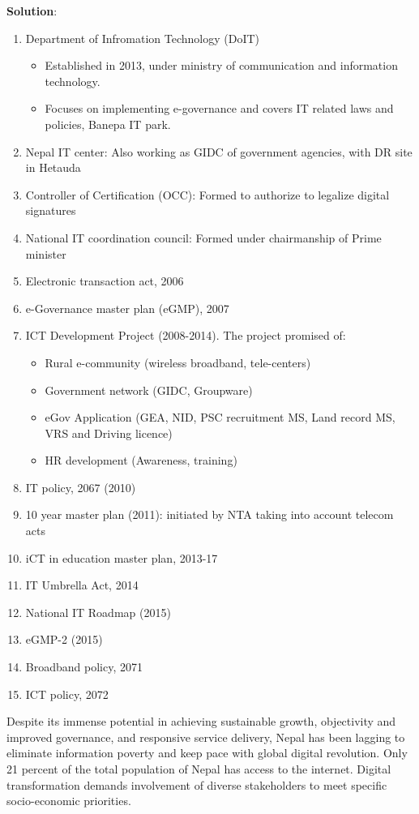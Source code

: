 \documentclass[
]{book}
\newenvironment{solution}{ {\bfseries Solution}:}{}
\begin{document}
\begin{questions}
\begin{solution}
\begin{enumerate}
\item Department of Infromation Technology (DoIT)
  \begin{itemize}
  \item Established in 2013, under ministry of communication and information technology.
  \item Focuses on implementing e-governance and covers IT related laws and policies, Banepa IT park.
  \end{itemize}
\item Nepal IT center: Also working as GIDC of government agencies, with DR site in Hetauda
\item Controller of Certification (OCC): Formed to authorize to legalize digital signatures
\item National IT coordination council: Formed under chairmanship of Prime minister
\item Electronic transaction act, 2006
\item e-Governance master plan (eGMP), 2007
\item ICT Development Project (2008-2014). The project promised of:
\begin{itemize}
\item Rural e-community (wireless broadband, tele-centers)
\item Government network (GIDC, Groupware)
\item eGov Application (GEA, NID, PSC recruitment MS, Land record MS, VRS and Driving licence)
\item HR development (Awareness, training)
\end{itemize}
\item IT policy, 2067 (2010)
\item 10 year master plan (2011): initiated by NTA taking into account telecom acts
\item iCT in education master plan, 2013-17
\item IT Umbrella Act, 2014
\item National IT Roadmap (2015)
\item eGMP-2 (2015)
\item Broadband policy, 2071
\item ICT policy, 2072
\end{enumerate}

Despite its immense potential in achieving sustainable growth, objectivity and improved governance, and responsive service delivery, Nepal has been lagging to eliminate information poverty and keep pace with global digital revolution. Only 21 percent of the total population of Nepal has access to the internet. Digital transformation demands involvement of diverse stakeholders to meet specific socio-economic priorities.


\end{solution}
\end{questions}
\end{document}
